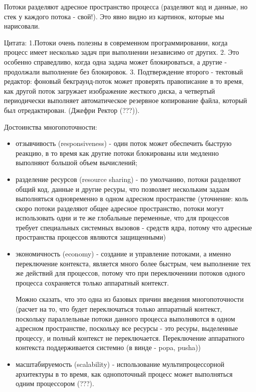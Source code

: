 \documentclass[a4paper, 12pt]{report}
\begin{document}
	Потоки разделяют адресное пространство процесса (разделяют код и данные, но стек у каждого потока - свой!). Это явно видно из картинок, которые мы нарисовали.
	
	Цитата: 1.Потоки очень полезны в современном программировании, когда процесс имеет несколько задач при выполнении независимо от других. 2. Это особенно справедливо, когда одна задача может блокироваться, а другие - продолжали выполнение без блокировок. 3. Подтверждение второго - тектовый редактор: фоновый бекграунд-поток может проверять правописание в то время, как другой поток загружает изображение жесткого диска, а четвертый периодически выполняет автоматическое резервное копирование файла, который был отредактирован. (Джефри Ректор (???)).
	
	Достоинства многопоточности:
	\begin{itemize}
		\item отзывчивость (responsiveness) - один поток может обеспечить быструю реакцию, в то время как другие потоки блокированы или медленно выполняют большой объем вычислений; 
		
		\item разделение ресурсов (resource sharing) - по умолчанию, потоки разделяют общий код, данные и другие ресуры, что позволяет нескольким задаам выполняться одновременно в одном адресном пространстве (уточнение: коль скоро потоки разделяют общее адресное пространство, потоки могут использовать одни и те же глобальные переменные, что для процессов требует специальных системных вызовов - средств ядра, потому что адресные пространства процессов  являются защищенными)
		
		\item экономичность (economy) - создание и управление потоками, а именно переключение контекста, является много более быстрым, чем выполнение тех же действий для процессов, потому что при переключениии потоков одного процесса сохраняется только аппаратный контекст.
		
		Можно сказать, что это одна из базовых причин введения многопоточности (расчет на то, что будет переключаться только аппаратный контекст, поскольку параллельные потоки данного процесса выполняются в одном адресном пространстве, поскольку все ресурсы - это ресуры, выделенные процессу, и полный контекст не переключается. Переключение аппаратного контекста поддерживается системно (в винде - popa, pusha))
		
		\item масштабируемость (scalability) - использование мультипроцессорной архитектуры в то время, как однопоточный процесс может выполняться одним процессором (???).
	\end{itemize}
	
\end{document}
